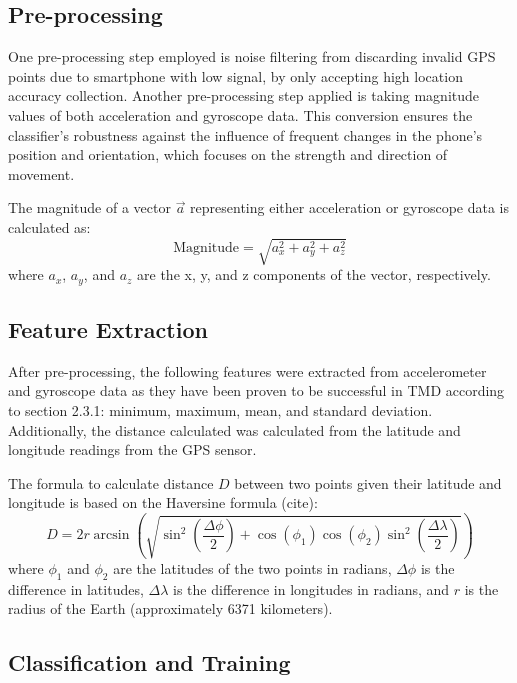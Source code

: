 \documentclass{l4proj}
\begin{document}
\subsection{Pre-processing}
One pre-processing step employed is noise filtering from discarding invalid GPS points due to smartphone with low signal, by only accepting high location accuracy collection. Another pre-processing step applied is taking magnitude values of both acceleration and gyroscope data. This conversion ensures the classifier's robustness against the influence of frequent changes in the phone's position and orientation, which focuses on the strength and direction of movement.

The magnitude of a vector \(\vec{a}\) representing either acceleration or gyroscope data is calculated as:
\begin{equation}
\text{Magnitude} = \sqrt{a_x^2 + a_y^2 + a_z^2}
\end{equation}
where \(a_x\), \(a_y\), and \(a_z\) are the x, y, and z components of the vector, respectively.

\subsection{Feature Extraction}
After pre-processing, the following features were extracted from accelerometer and gyroscope data as they have been proven to be successful in TMD according to section 2.3.1: minimum, maximum, mean, and standard deviation. Additionally, the distance calculated was calculated from the latitude and longitude readings from the GPS sensor.

The formula to calculate distance \(D\) between two points given their latitude and longitude is based on the Haversine formula (cite):
\begin{equation}
D = 2r \arcsin\left(\sqrt{\sin^2\left(\frac{\Delta \phi}{2}\right) + \cos(\phi_1) \cos(\phi_2) \sin^2\left(\frac{\Delta \lambda}{2}\right)}\right)
\end{equation}
where \(\phi_1\) and \(\phi_2\) are the latitudes of the two points in radians, \(\Delta \phi\) is the difference in latitudes, \(\Delta \lambda\) is the difference in longitudes in radians, and \(r\) is the radius of the Earth (approximately 6371 kilometers).

\subsection{Classification and Training}
\end{document}
